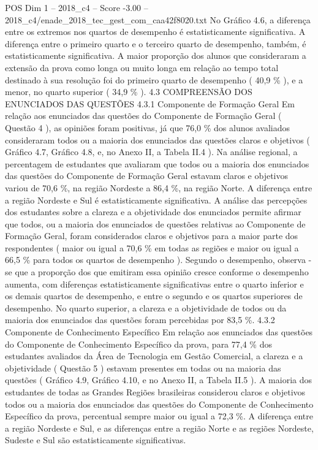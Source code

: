 \begin{textsample}{POS Dim 1 – 2018\_c4 – Score -3.00 – 2018\_c4/enade\_2018\_tec\_gest\_com\_caa42f8020.txt}
No Gráfico 4.6, a diferença entre os extremos nos quartos de desempenho é estatisticamente significativa.
A diferença entre o primeiro quarto e o terceiro quarto de desempenho, também, é estatisticamente significativa.
A maior proporção dos alunos que consideraram a extensão da prova como longa ou muito longa em relação ao tempo total destinado à sua resolução foi do primeiro quarto de desempenho ( 40,9 \% ), e a menor, no quarto superior ( 34,9 \% ). 4.3 COMPREENSÃO DOS ENUNCIADOS DAS QUESTÕES 4.3.1 Componente de Formação Geral Em relação aos enunciados das questões do Componente de Formação Geral ( Questão 4 ), as opiniões foram positivas, já que 76,0 \% dos alunos avaliados consideraram todos ou a maioria dos enunciados das questões claros e objetivos ( Gráfico 4.7, Gráfico 4.8, e, no Anexo II, a Tabela II.4 ).
Na análise regional, a percentagem de estudantes que avaliaram que todos ou a maioria dos enunciados das questões do Componente de Formação Geral estavam claros e objetivos variou de 70,6 \%, na região Nordeste a 86,4 \%, na região Norte.
A diferença entre a região Nordeste e Sul é estatisticamente significativa.
A análise das percepções dos estudantes sobre a clareza e a objetividade dos enunciados permite afirmar que todos, ou a maioria dos enunciados de questões relativas ao Componente de Formação Geral, foram considerados claros e objetivos para a maior parte dos respondentes ( maior ou igual a 70,6 \% em todas as regiões e maior ou igual a 66,5 \% para todos os quartos de desempenho ).
Segundo o desempenho, observa -se que a proporção dos que emitiram essa opinião cresce conforme o desempenho aumenta, com diferenças estatisticamente significativas entre o quarto inferior e os demais quartos de desempenho, e entre o segundo e os quartos superiores de desempenho.
No quarto superior, a clareza e a objetividade de todos ou da maioria dos enunciados das questões foram percebidas por 83,5 \%. 4.3.2 Componente de Conhecimento Específico Em relação aos enunciados das questões do Componente de Conhecimento Específico da prova, para 77,4 \% dos estudantes avaliados da Área de Tecnologia em Gestão Comercial, a clareza e a objetividade ( Questão 5 ) estavam presentes em todas ou na maioria das questões ( Gráfico 4.9, Gráfico 4.10, e no Anexo II, a Tabela II.5 ).
A maioria dos estudantes de todas as Grandes Regiões brasileiras considerou claros e objetivos todos ou a maioria dos enunciados das questões do Componente de Conhecimento Específico da prova, percentual sempre maior ou igual a 72,3 \%.
A diferença entre a região Nordeste e Sul, e as diferenças entre a região Norte e as regiões Nordeste, Sudeste e Sul são estatisticamente significativas.

\end{textsample}
